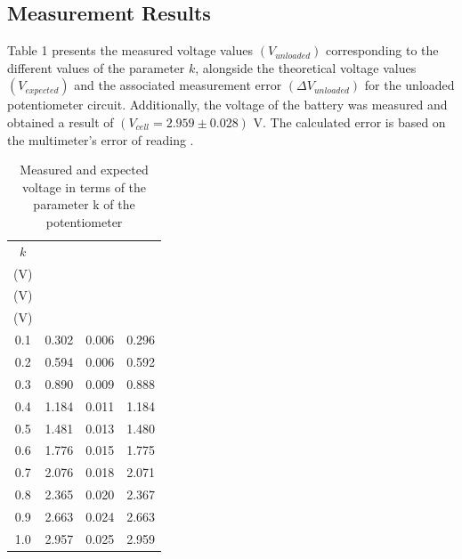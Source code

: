\documentclass[a4paper]{article}
\begin{document}
\subsection{Measurement Results}
Table 1 presents the measured voltage values $(V_{unloaded})$ corresponding to the different values of the parameter $k$, 
alongside the theoretical voltage values $(V_{expected})$ 
and the associated measurement error $(\Delta V_{unloaded})$ for the unloaded potentiometer circuit.
Additionally, the voltage of the battery was measured and obtained a result of $(V_{cell} = 2.959 \pm 0.028)$ V. 
The calculated error is based on the multimeter's error of reading \cite{noauthor_am-500_2019}.
\begin{table}[!ht]
    \centering
    \label{tab:1}
    \caption{Measured and expected voltage in terms of the parameter k of the potentiometer}
    \begin{tabular}{|c c c c|} 
    \hline
    $k$ & \makecell{$V_{unloaded}$ \\ (V)} & \makecell{$\Delta V_{unloaded}$ \\ (V)} &
    \makecell{$V_{expected}$ \\ (V)}  \\ 
    \hline
    0.1                                       & 0.302      &  0.006          & 0.296      \\
    0.2                                       & 0.594      &  0.006          & 0.592      \\
    0.3                                       & 0.890      &  0.009          & 0.888      \\
    0.4                                       & 1.184      &  0.011          & 1.184      \\
    0.5                                       & 1.481      &  0.013          & 1.480      \\
    0.6                                       & 1.776      &  0.015          & 1.775      \\
    0.7                                       & 2.076      &  0.018          & 2.071      \\
    0.8                                       & 2.365      &  0.020          & 2.367      \\
    0.9                                       & 2.663      &  0.024          & 2.663      \\
    1.0                                       & 2.957      &  0.025          & 2.959      \\
    \hline
    \end{tabular}
    \end{table}
\newpage
\end{document}
